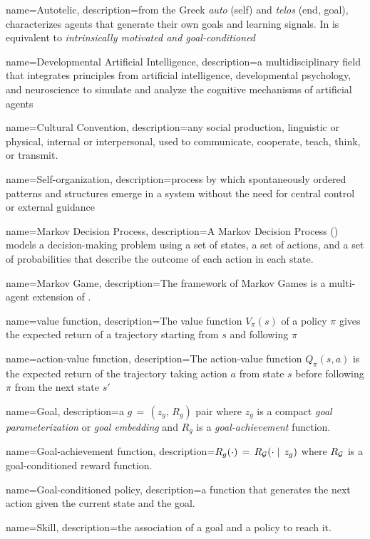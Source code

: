 \makeglossaries

{
    name=Autotelic,
    description={from the Greek \textit{auto} (self) and \textit{telos} (end, goal), characterizes agents that generate their own goals and learning signals. In is equivalent to \textit{intrinsically motivated and goal-conditioned}}
}

{
	name=Developmental Artificial Intelligence,
	description={a multidisciplinary field that integrates principles from artificial intelligence, developmental psychology, and neuroscience to simulate and analyze the cognitive mechanisms of artificial agents}
}


{
	name=Cultural Convention,
	description={any social production, linguistic or physical, internal or interpersonal, used to communicate, cooperate, teach, think, or transmit.}
}

{
	name=Self-organization,
	description={process by which spontaneously ordered patterns and structures emerge in a system without the need for central control or external guidance}
}

{
	name=Markov Decision Process,
	description={A Markov Decision Process (\mdp) models a decision-making problem using a set of states, a set of actions, and a set of probabilities that describe the outcome of each action in each state.}
}

{
	name=Markov Game,
	description={The framework of Markov Games is a multi-agent extension of \mdps.}
}

{
	name=value function,
	description={The value function $V_\pi(s)$ of a policy $\pi$ gives the expected return of a trajectory starting from $s$ and following $\pi$}
}

{
	name=action-value function,
	description={The action-value function $Q_\pi(s,a)$ is the expected return of the trajectory taking action $a$ from state $s$ before following $\pi$ from the next state $s'$}
}

{
	name=Goal,
	description={a $g\,=\,(z_g,\,R_g)$ pair where $z_g$ is a compact \textit{goal parameterization} or \textit{goal embedding} and $R_g$ is a \textit{goal-achievement} function.}
}

{
	name=Goal-achievement function,
	description={$R_g(\cdot)\,=\,R_{\mathcal{G}}(\cdot\mid\,z_g)$} where $R_{\mathcal{G}}$ is a goal-conditioned reward function.
}


{
	name=Goal-conditioned policy,
	description={a function that generates the next action given the current state and the goal.}
}

{
	name=Skill,
	description={the association of a goal and a policy to reach it.}
}


